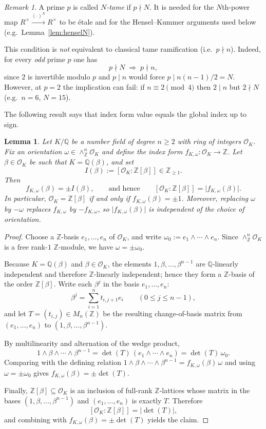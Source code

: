 \documentclass[11pt,letterpaper]{amsart}
\newcommand{\Z}{\mathbb{Z}}
\newcommand{\Q}{\mathbb{Q}}
\newcommand{\OO}{\mathcal{O}}
\theoremstyle{plain}
\newtheorem{lemma}[theorem]{Lemma}
\theoremstyle{definition}
\theoremstyle{remark}
\newtheorem{remark}[theorem]{Remark}
\theoremstyle{plain}
\begin{document}
\begin{remark}
\label{rem:Ntame-vs-tame}
A prime $p$ is called \emph{$N$-tame} if $p\nmid N$. It is needed for the $N$th-power map $R^\times \xrightarrow{(\cdot)^N} R^\times$ to be \'etale and for the Hensel--Kummer arguments used below
(e.g.\ Lemma~\ref{lem:henselN}).

This condition is \emph{not} equivalent to classical tame ramification (i.e.\ $p\nmid n$).
Indeed, for every \emph{odd} prime $p$ one has
\[
p\nmid N \;\Longrightarrow\; p\nmid n,
\]
since $2$ is invertible modulo $p$ and $p\mid n$ would force $p\mid n(n-1)/2=N$.
However, at $p=2$ the implication can fail: if $n\equiv 2\pmod 4$ then $2\mid n$ but $2\nmid N$
(e.g.\ $n=6$, $N=15$).
\end{remark}

The following result says that index form value equals the global index up to sign.
\begin{lemma}
\label{lem:index-equals-indexform}
Let $K/\Q$ be a number field of degree $n\ge 2$ with ring of integers $\OO_K$.
Fix an orientation $\omega\in \wedge^n_{\Z}\OO_K$ and define the index form
$f_{K,\omega}:\OO_K\to\Z$. Let $\beta\in\OO_K$ be such that $K=\Q(\beta)$, and set
\[
I(\beta):=[\OO_K:\Z[\beta]]\in\Z_{\ge 1}.
\]
Then
\[
f_{K,\omega}(\beta)=\pm I(\beta),
\qquad\text{and hence}\qquad
[\OO_K:\Z[\beta]]=\bigl|f_{K,\omega}(\beta)\bigr|.
\]
In particular, $\OO_K=\Z[\beta]$ if and only if $f_{K,\omega}(\beta)=\pm 1$.
Moreover, replacing $\omega$ by $-\omega$ replaces $f_{K,\omega}$ by $-f_{K,\omega}$, so
$\bigl|f_{K,\omega}(\beta)\bigr|$ is independent of the choice of orientation.
\end{lemma}

\begin{proof}
Choose a $\Z$-basis $e_1,\dots,e_n$ of $\OO_K$, and write
$\omega_0:=e_1\wedge\cdots\wedge e_n$. Since $\wedge^n_\Z\OO_K$ is a free rank-$1$ $\Z$-module,
we have $\omega=\pm\omega_0$.

Because $K=\Q(\beta)$ and $\beta\in\OO_K$, the elements $1,\beta,\dots,\beta^{n-1}$ are
$\Q$-linearly independent and therefore $\Z$-linearly independent; hence they form a $\Z$-basis of
the order $\Z[\beta]$.  Write each $\beta^{j}$ in the basis $e_1,\dots,e_n$:
\[
\beta^{j}=\sum_{i=1}^n t_{i,j+1} e_i\qquad(0\le j\le n-1),
\]
and let $T=(t_{i,j})\in M_n(\Z)$ be the resulting change-of-basis matrix from
$(e_1,\dots,e_n)$ to $(1,\beta,\dots,\beta^{n-1})$.

By multilinearity and alternation of the wedge product,
\[
1\wedge \beta \wedge \cdots \wedge \beta^{n-1}
=
\det(T)\,(e_1\wedge\cdots\wedge e_n)
=
\det(T)\,\omega_0.
\]
Comparing with the defining relation
$1\wedge \beta \wedge \cdots \wedge \beta^{n-1}=f_{K,\omega}(\beta)\,\omega$
and using $\omega=\pm\omega_0$ gives $f_{K,\omega}(\beta)=\pm\det(T)$.

Finally, $\Z[\beta]\subseteq \OO_K$ is an inclusion of full-rank $\Z$-lattices whose matrix in the
bases $(1,\beta,\dots,\beta^{n-1})$ and $(e_1,\dots,e_n)$ is exactly $T$. Therefore
\[
[\OO_K:\Z[\beta]] = |\det(T)|,
\]
and combining with $f_{K,\omega}(\beta)=\pm\det(T)$ yields the claim.
\end{proof}
\end{document}

